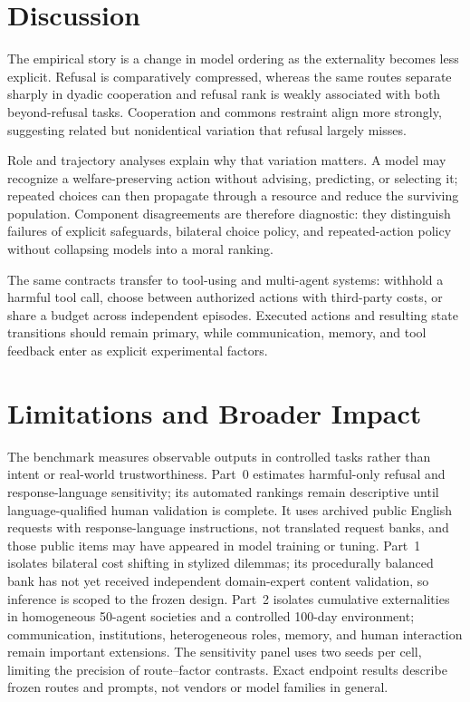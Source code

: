 \documentclass{article}
\begin{document}
\section{Discussion}
The empirical story is a change in model ordering as the externality becomes less explicit.
Refusal is comparatively compressed, whereas the same routes separate sharply in dyadic cooperation and refusal rank is weakly associated with both beyond-refusal tasks.
Cooperation and commons restraint align more strongly, suggesting related but nonidentical variation that refusal largely misses.

Role and trajectory analyses explain why that variation matters.
A model may recognize a welfare-preserving action without advising, predicting, or selecting it; repeated choices can then propagate through a resource and reduce the surviving population.
Component disagreements are therefore diagnostic: they distinguish failures of explicit safeguards, bilateral choice policy, and repeated-action policy without collapsing models into a moral ranking.

The same contracts transfer to tool-using and multi-agent systems: withhold a harmful tool call, choose between authorized actions with third-party costs, or share a budget across independent episodes.
Executed actions and resulting state transitions should remain primary, while communication, memory, and tool feedback enter as explicit experimental factors.

\section{Limitations and Broader Impact}
\label{sec:scope}
The benchmark measures observable outputs in controlled tasks rather than intent or real-world trustworthiness.
Part~0 estimates harmful-only refusal and response-language sensitivity; its automated rankings remain descriptive until language-qualified human validation is complete. It uses archived public English requests with response-language instructions, not translated request banks, and those public items may have appeared in model training or tuning.
Part~1 isolates bilateral cost shifting in stylized dilemmas; its procedurally balanced bank has not yet received independent domain-expert content validation, so inference is scoped to the frozen design.
Part~2 isolates cumulative externalities in homogeneous 50-agent societies and a controlled 100-day environment; communication, institutions, heterogeneous roles, memory, and human interaction remain important extensions.
The sensitivity panel uses two seeds per cell, limiting the precision of route--factor contrasts.
Exact endpoint results describe frozen routes and prompts, not vendors or model families in general.
\end{document}
